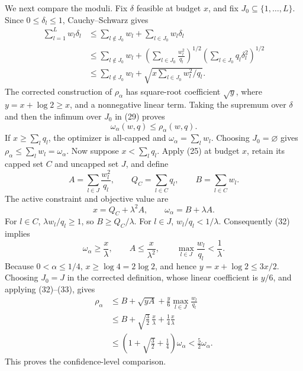 We next compare the moduli. Fix \(\delta\) feasible at budget \(x\), and fix \(J_0\subseteq\{1,\ldots,L\}\). Since \(0\le\delta_l\le1\), Cauchy--Schwarz gives
\[
\begin{aligned}
 \sum_{l=1}^Lw_l\delta_l
 &\le\sum_{l\notin J_0}w_l+
      \sum_{l\in J_0}w_l\delta_l\\
 &\le\sum_{l\notin J_0}w_l+
 \left(\sum_{l\in J_0}\frac{w_l^2}{q_l}\right)^{1/2}
 \left(\sum_{l\in J_0}q_l\delta_l^2\right)^{1/2}\\
 &\le\sum_{l\notin J_0}w_l+
 \sqrt{x\sum_{l\in J_0}w_l^2/q_l}.
\end{aligned}
\tag{29}
\]
The corrected construction of \(\rho_\alpha\) has square-root coefficient \(\sqrt y\), where \(y=x+\log2\ge x\), and a nonnegative linear term. Taking the supremum over \(\delta\) and then the infimum over \(J_0\) in (29) proves
\[
 \omega_\alpha(w,q)\le\rho_\alpha(w,q).
\tag{30}
\]
If \(x\ge\sum_lq_l\), the optimizer is all-capped and \(\omega_\alpha=\sum_lw_l\). Choosing \(J_0=\varnothing\) gives \(\rho_\alpha\le\sum_lw_l=\omega_\alpha\). Now suppose \(x<\sum_lq_l\). Apply (25) at budget \(x\), retain its capped set \(C\) and uncapped set \(J\), and define
\[
 A=\sum_{l\in J}\frac{w_l^2}{q_l},\qquad
 Q_C=\sum_{l\in C}q_l,\qquad
 B=\sum_{l\in C}w_l.
\tag{31}
\]
The active constraint and objective value are
\[
 x=Q_C+\lambda^2A,
 \qquad
 \omega_\alpha=B+\lambda A.
\tag{32}
\]
For \(l\in C\), \(\lambda w_l/q_l\ge1\), so \(B\ge Q_C/\lambda\). For \(l\in J\), \(w_l/q_l<1/\lambda\). Consequently (32) implies
\[
 \omega_\alpha\ge\frac{x}{\lambda},
 \qquad A\le\frac{x}{\lambda^2},
 \qquad \max_{l\in J}\frac{w_l}{q_l}<\frac1\lambda.
\tag{33}
\]
Because \(0<\alpha\le1/4\), \(x\ge\log4=2\log2\), and hence \(y=x+\log2\le3x/2\). Choosing \(J_0=J\) in the corrected definition, whose linear coefficient is \(y/6\), and applying (32)--(33), gives
\[
\begin{aligned}
 \rho_\alpha
 &\le B+\sqrt{yA}+\frac y6\max_{l\in J}\frac{w_l}{q_l}\\
 &\le B+\sqrt{\frac32}\,\frac{x}{\lambda}
       +\frac14\frac{x}{\lambda}\\
 &\le\left(1+\sqrt{\frac32}+\frac14\right)\omega_\alpha
 <\frac52\omega_\alpha.
\end{aligned}
\tag{34}
\]
This proves the confidence-level comparison.

